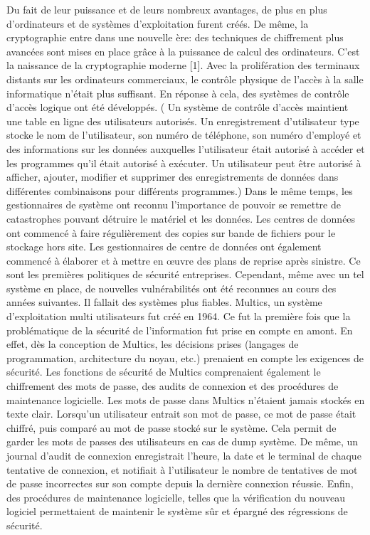 Du fait de leur puissance et de leurs nombreux avantages, de plus en plus d’ordinateurs et de systèmes d’exploitation furent créés. De même, la cryptographie entre dans une nouvelle ère: des techniques de chiffrement plus avancées sont mises en place grâce à la puissance de calcul des ordinateurs. C’est la naissance de la cryptographie moderne [1].
Avec la prolifération des terminaux distants sur les ordinateurs commerciaux, le contrôle physique de l'accès à la salle informatique n'était plus suffisant. En réponse à cela, des systèmes de contrôle d'accès logique ont été développés. ( Un système de contrôle d'accès maintient une table en ligne des utilisateurs autorisés. Un enregistrement d'utilisateur type stocke le nom de l'utilisateur, son numéro de téléphone, son numéro d'employé et des informations sur les données auxquelles l'utilisateur était autorisé à accéder et les programmes qu'il était autorisé à exécuter. Un utilisateur peut être autorisé à afficher, ajouter, modifier et supprimer des enregistrements de données dans différentes combinaisons pour différents programmes.) Dans le même temps, les gestionnaires de système ont reconnu l'importance de pouvoir se remettre de catastrophes pouvant détruire le matériel et les données. Les centres de données ont commencé à faire régulièrement des copies sur bande de fichiers pour le stockage hors site. Les gestionnaires de centre de données ont également commencé à élaborer et à mettre en œuvre des plans de reprise après sinistre. Ce sont les premières politiques de sécurité entreprises. Cependant, même avec un tel système en place, de nouvelles vulnérabilités ont été reconnues au cours des années suivantes. Il fallait des systèmes plus fiables. 
Multics, un système d’exploitation multi utilisateurs fut créé en 1964. Ce fut la première fois que la problématique de la sécurité de l’information fut prise en compte en amont. En effet, dès la conception de Multics, les décisions prises (langages de programmation, architecture du noyau, etc.) prenaient en compte les exigences de sécurité. Les fonctions de sécurité de Multics comprenaient également le chiffrement des mots de passe, des audits de connexion et des procédures de maintenance logicielle. Les mots de passe dans Multics n’étaient jamais stockés en texte clair. Lorsqu'un utilisateur entrait son mot de passe, ce mot de passe était chiffré, puis comparé au mot de passe stocké sur le système. Cela permit de garder les mots de passes des utilisateurs en cas de dump système. De même, un journal d'audit de connexion enregistrait l'heure, la date et le terminal de chaque tentative de connexion, et notifiait à l'utilisateur le nombre de tentatives de mot de passe incorrectes sur son compte depuis la dernière connexion réussie. Enfin, des procédures de maintenance logicielle, telles que la vérification du nouveau logiciel permettaient de maintenir le système sûr et épargné des régressions de sécurité.
